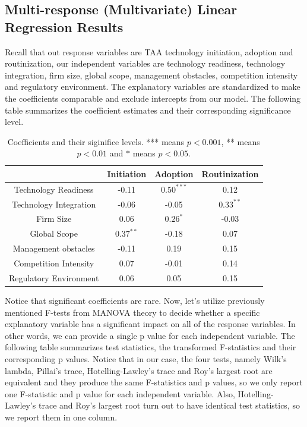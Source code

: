 \documentclass[12pt]{article}
\begin{document}
\subsection{Multi-response (Multivariate) Linear Regression Results}
Recall that out response variables are TAA technology initiation, adoption and routinization, our independent variables are technology readiness, technology integration, firm size, global scope, management obstacles, competition intensity and regulatory environment. The explanatory variables are standardized to make the coefficients comparable and exclude intercepts from our model. The following table summarizes the coefficient estimates and their corresponding significance level. 
\begin{table}[H]
\centering
\begin{tabular}{|c|c|c|c|}
\hline
                       & Initiation & Adoption  & Routinization \\ \hline
Technology Readiness   & -0.11      & $0.50^{***}$ & 0.12          \\ \hline
Technology Integration & -0.06      & -0.05     & $0.33^{**}$      \\ \hline
Firm Size              & 0.06       & $0.26^*$    & -0.03         \\ \hline
Global Scope           & $0.37^{**}$  & -0.18     & 0.07          \\ \hline
Management obstacles   & -0.11      & 0.19      & 0.15          \\ \hline
Competition Intensity  & 0.07       & -0.01     & 0.14          \\ \hline
Regulatory Environment & 0.06       & 0.05      & 0.15          \\ \hline
\end{tabular}
\caption{Coefficients and their siginifice levels. *** means $p<0.001$, ** means $p<0.01$ and $*$ means $p<0.05$.}
\end{table}
Notice that significant coefficients are rare.  Now, let's utilize previously mentioned F-tests from MANOVA theory to decide whether a specific explanatory variable has a significant impact on all of the response variables. In other words, we can provide a single p value for each independent variable. The following table summarizes test statistics, the transformed F-statistics and their corresponding p values. Notice that in our case, the four tests, namely Wilk's lambda, Pillai's trace, Hotelling-Lawley's trace and Roy's largest root are equivalent and they produce the same F-statistics and p values, so we only report one F-statistic and p value for each independent variable. Also, Hotelling-Lawley's trace and Roy's largest root turn out to have identical test statistics, so we report them in one column.
\end{document}
